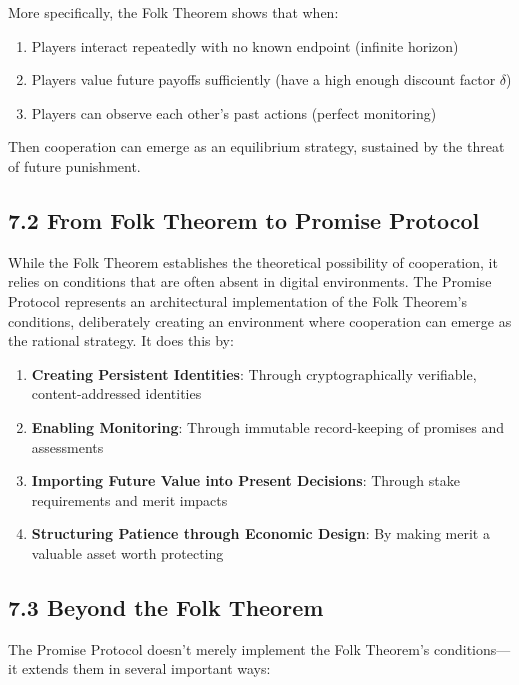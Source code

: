 \documentclass[11pt]{article}
\begin{document}
More specifically, the Folk Theorem shows that when:
\begin{enumerate}
\item Players interact repeatedly with no known endpoint (infinite horizon)
\item Players value future payoffs sufficiently (have a high enough discount factor \(\delta\))
\item Players can observe each other's past actions (perfect monitoring)
\end{enumerate}

Then cooperation can emerge as an equilibrium strategy, sustained by the threat of future punishment.
\subsection{7.2 From Folk Theorem to Promise Protocol}
\label{sec:org4784f96}
While the Folk Theorem establishes the theoretical possibility of cooperation, it relies on conditions that are often absent in digital environments. The Promise Protocol represents an architectural implementation of the Folk Theorem's conditions, deliberately creating an environment where cooperation can emerge as the rational strategy. It does this by:

\begin{enumerate}
\item \textbf{Creating Persistent Identities}: Through cryptographically verifiable, content-addressed identities
\item \textbf{Enabling Monitoring}: Through immutable record-keeping of promises and assessments
\item \textbf{Importing Future Value into Present Decisions}: Through stake requirements and merit impacts
\item \textbf{Structuring Patience through Economic Design}: By making merit a valuable asset worth protecting
\end{enumerate}
\subsection{7.3 Beyond the Folk Theorem}
\label{sec:org3adc541}
The Promise Protocol doesn't merely implement the Folk Theorem's conditions—it extends them in several important ways:
\end{document}
